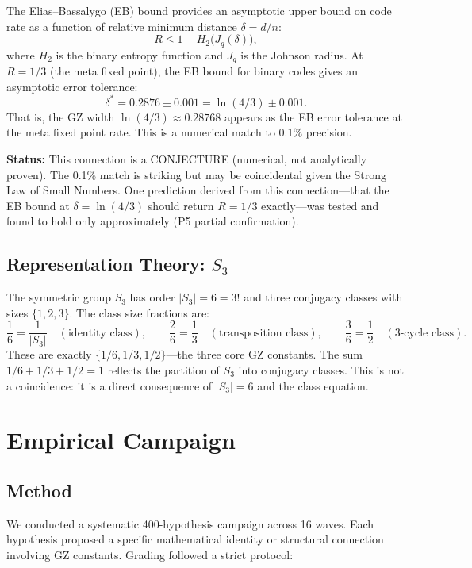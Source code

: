 \documentclass[11pt,a4paper]{article}
\begin{document}
The Elias--Bassalygo (EB) bound provides an asymptotic upper bound on code rate as a function of relative minimum distance $\delta = d/n$:
\[
R \leq 1 - H_2\!\bigl(J_q(\delta)\bigr),
\]
where $H_2$ is the binary entropy function and $J_q$ is the Johnson radius. At $R = 1/3$ (the meta fixed point), the EB bound for binary codes gives an asymptotic error tolerance:
\[
\delta^* = 0.2876 \pm 0.001 = \ln(4/3) \pm 0.001.
\]
That is, the GZ width $\ln(4/3) \approx 0.28768$ appears as the EB error tolerance at the meta fixed point rate. This is a numerical match to 0.1\% precision.

\textbf{Status:} This connection is a CONJECTURE (numerical, not analytically proven). The 0.1\% match is striking but may be coincidental given the Strong Law of Small Numbers. One prediction derived from this connection---that the EB bound at $\delta = \ln(4/3)$ should return $R = 1/3$ exactly---was tested and found to hold only approximately (P5 partial confirmation).

\subsection{Representation Theory: $S_3$}

The symmetric group $S_3$ has order $|S_3| = 6 = 3!$ and three conjugacy classes with sizes $\{1, 2, 3\}$. The class size fractions are:
\[
\frac{1}{6} = \frac{1}{|S_3|} \quad (\text{identity class}), \qquad
\frac{2}{6} = \frac{1}{3} \quad (\text{transposition class}), \qquad
\frac{3}{6} = \frac{1}{2} \quad (\text{3-cycle class}).
\]
These are exactly $\{1/6, 1/3, 1/2\}$---the three core GZ constants. The sum $1/6 + 1/3 + 1/2 = 1$ reflects the partition of $S_3$ into conjugacy classes. This is not a coincidence: it is a direct consequence of $|S_3| = 6$ and the class equation.

\section{Empirical Campaign}

\subsection{Method}

We conducted a systematic 400-hypothesis campaign across 16 waves. Each hypothesis proposed a specific mathematical identity or structural connection involving GZ constants. Grading followed a strict protocol:
\end{document}
